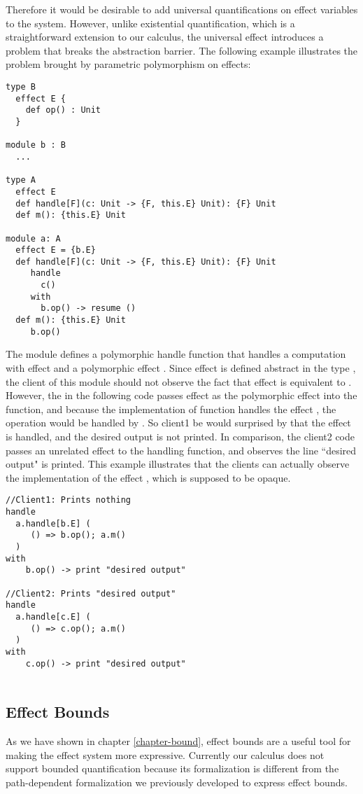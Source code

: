 Therefore it would be desirable to add universal quantifications on effect variables to the system. However, unlike existential quantification, which is a straightforward extension to our calculus, the universal effect introduces a problem that breaks the abstraction barrier. The following example illustrates the problem brought by parametric polymorphism on effects:

\begin{lstlisting}
type B
  effect E {
  	def op() : Unit
  }

module b : B
  ...

type A
  effect E 
  def handle[F](c: Unit -> {F, this.E} Unit): {F} Unit
  def m(): {this.E} Unit
  
module a: A
  effect E = {b.E}
  def handle[F](c: Unit -> {F, this.E} Unit): {F} Unit
     handle
       c()
     with
       b.op() -> resume ()
  def m(): {this.E} Unit
     b.op()
  \end{lstlisting}

The module  defines a polymorphic handle function that handles a computation with effect  and a polymorphic effect . Since effect  is defined abstract in the type , the client of this module should not observe the fact that effect  is equivalent to . However, the  in the following code passes effect  as the polymorphic effect into the  function, and because the implementation of   function handles the effect , the operation  would be handled by . So client1 be would surprised by that the effect  is handled, and the desired output is not printed. In comparison, the client2 code passes an unrelated effect  to the handling function, and observes the line ``desired output" is printed. This example illustrates that the clients can actually observe the implementation of the effect , which is supposed to be opaque.
\begin{lstlisting}
//Client1: Prints nothing
handle 
  a.handle[b.E] (
     () => b.op(); a.m()
  )
with
    b.op() -> print "desired output"

//Client2: Prints "desired output"
handle 
  a.handle[c.E] (
     () => c.op(); a.m()
  )
with
    c.op() -> print "desired output"
    
\end{lstlisting}


\subsection{Effect Bounds}
As we have shown in chapter \ref{chapter-bound}, effect bounds are a useful tool for making the effect system more expressive. Currently our calculus does not support bounded quantification because its formalization is different from the path-dependent formalization we previously developed to express effect bounds. 

